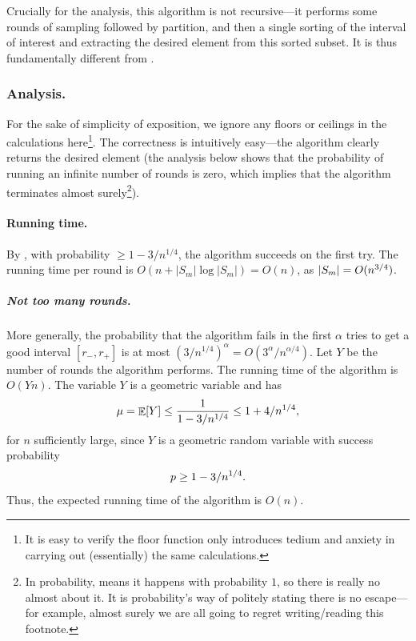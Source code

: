 \begin{remark}
    Crucially for the analysis, this algorithm is not recursive---it
    performs some rounds of sampling followed by partition, and then a
    single sorting of the interval of interest and extracting the desired
    element from this sorted subset. It is thus fundamentally different
    from .
\end{remark}

\subsubsection{Analysis.}

For the sake of simplicity of exposition, we ignore any floors or
ceilings in the calculations here\footnote{It is easy to verify the floor
   function only introduces tedium and anxiety in carrying out
   (essentially) the same calculations.}.  The correctness is intuitively
easy---the algorithm clearly returns the desired element (the analysis
below shows that the probability of running an infinite number of rounds
is zero, which implies that the algorithm terminates almost
surely\footnote{In probability,  means it happens with probability $1$, so there is really
   no almost about it. It is probability's way of politely stating there
   is no escape---for example, almost surely we are all going to regret
   writing/reading this footnote.}).


\paragraph*{Running time.}
By , with probability $\geq 1-3/n^{1 /4}$, the
algorithm succeeds on the first try.  The running time per round is
$O(n + |S_m| \log |S_m|) = O(n)$, as $\left| {S_m} \right| = O(n^{3/4})$.




\subparagraph*{Not too many rounds.}

More generally, the probability that the algorithm fails in the first
$\alpha$ tries to get a good interval $[r_{-}, r_{+}]$ is at most
$(3/n^{1/4})^\alpha = O(3^\alpha /n^{\alpha /4})$. Let $Y$ be the number
of rounds the algorithm performs. The running time of the algorithm is
$ O(Yn)$.  The variable $Y$ is a geometric variable and has
\begin{equation}
    \mu = \Ex{Y} \leq  \frac{1}{  1- 3/n^{1/4}} \leq 1 + 4/n^{1/4},
    \eqlab{q-s-few-rounds}
\end{equation}
for $n$ sufficiently large, since $Y$ is a geometric random variable with
success probability
\begin{equation}
    p \geq 1 - 3/n^{1/4}.
    \eqlab{s-p-r-selection}
\end{equation}
Thus, the expected running time of the algorithm is $O(n)$.

